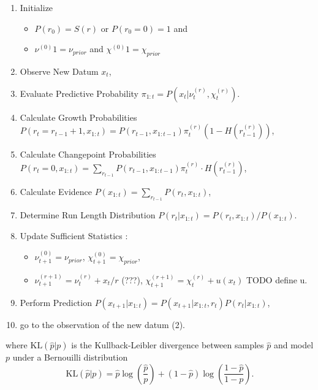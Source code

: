 \documentclass[profile,final,english,draft]{article}%
\newcommand{\KL}[2]{\text{KL}( #1 | #2 )}
\newcommand{\pa}[1]{\left( #1 \right)}
\newcommand{\Jj}{\mathcal{J}}
\newcommand{\seeApp}[1]{Appendix~\ref{app:#1}}
\begin{document}
\begin{enumerate}
	\item     Initialize

	\begin{itemize}
		\item    $P(r_0)= S(r)$ or $P(r_0=0)=1$ and
		\item    $\nu^{(0)}1 = \nu_{prior}$ and $\chi^{(0)}1 = \chi_{prior}$
	\end{itemize}

	\item    Observe New Datum $x_t$,
    \item    Evaluate Predictive Probability $\pi_{1:t} = P(x_t |\nu^{(r)}_t,\chi^{(r)}_t)$.
    \item    Calculate Growth Probabilities $P(r_t=r_{t-1}+1, x_{1:t}) = P(r_{t-1}, x_{1:t-1}) \pi^{(r)}_t (1-H(r^{(r)}_{t-1}))$,
    \item    Calculate Changepoint Probabilities $P(r_t=0, x_{1:t})= \sum_{r_{t-1}} P(r_{t-1}, x_{1:t-1}) \pi^{(r)}_t \cdot H(r^{(r)}_{t-1})$,
    \item    Calculate Evidence $P(x_{1:t}) = \sum_{r_{t-1}} P (r_t, x_{1:t})$,
    \item    Determine Run Length Distribution $P (r_t | x_{1:t}) = P (r_t, x_{1:t})/P (x_{1:t}) $.
    \item    Update Sufficient Statistics :
	\begin{itemize}
		\item    $\nu^{(0)}_{t+1} = \nu_{prior}$, $\chi^{(0)}_{t+1} = \chi_{prior}$,
		\item    $\nu^{(r+1)}_{t+1} = \nu^{(r)}_{t} + x_t/r$ (???), $\chi^{(r+1)}_{t+1} = \chi^{(r)}_{t} + u(x_t)$ TODO define u.
	\end{itemize}

    \item    Perform Prediction $P (x_{t+1} | x_{1:t}) = P (x_{t+1}|x_{1:t} , r_t) P (r_t|x_{1:t})$,
    \item    go to the observation of the new datum (2).
\end{enumerate}





where $\KL{\hat p}{p}$ is the Kullback-Leibler divergence between samples $\hat p$ and model $p$ under a Bernouilli distribution
\begin{equation}
\KL{\hat p}{p} = \hat{p} \log\pa{\frac{\hat p}{p}} + (1-\hat p) \log\pa{\frac{1-\hat p}{1-p}}.
\end{equation}
\end{document}
